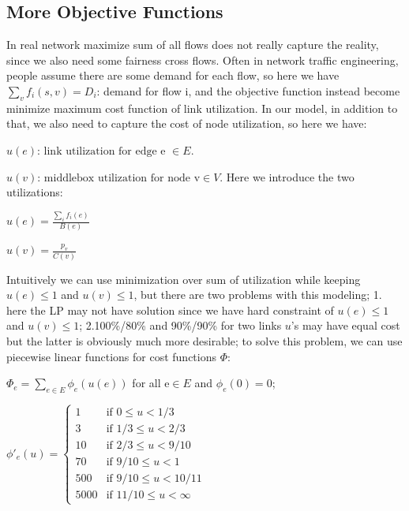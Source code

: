 \documentclass[twoside,leqno, 11pt]{article}
\begin{document}
\subsection {More Objective Functions} In real network maximize sum of all flows does not really capture the reality, since we also need some fairness cross flows. Often in network traffic engineering, people assume there are some demand for each flow, so here we have $\sum\limits_v f_i (s, v) =D_i$: demand for flow i, and the objective function instead become minimize maximum cost function of link utilization. In our model, in addition to that, we also need to capture the cost of node utilization, so here we have:

$u(e) $: $ \text{link utilization for edge e }\in E $.

$u(v)$: $ \text{middlebox utilization for node v} \in V$.
\newline\newline
Here we introduce the two utilizations: 
\newline

$u(e) = \frac{\sum\limits_{i} f_{i}(e) } {B(e)}$ \newline

$u(v) = \frac{ p_v } {C(v)} $ \newline 

Intuitively we can use minimization over sum of utilization while keeping $u(e)\leq 1$ and $u(v)\leq 1$, but there are two problems with this modeling; 1. here the LP may not have solution since we have hard constraint of   $u(e)\leq 1$ and $u(v)\leq 1$; 2.100\%/80\% and 90\%/90\% for two links $u$'s may have equal cost but the latter is obviously much more desirable; to solve this problem, we can use piecewise linear functions for cost functions $\Phi$: %
 
 $\Phi_e = \sum\limits_{e\in E} \phi_e(u (e) )$ for all e$\in E$ and $ \phi_e(0)=0$; 
 
$
\phi'_e(u )=
\left\{
	\begin{array}{ll}
		1  & \mbox{if } 0\leq u <1/3 \\
		3 & \mbox{if } 1/3\leq u < 2/3 \\
		10 & \mbox{if } 2/3\leq u < 9/10 \\
		70 & \mbox{if } 9/10\leq u < 1\\
		500 & \mbox{if } 9/10\leq u < 10/11\\
		5000 & \mbox{if } 11/10\leq u < \infty
	\end{array}
\right.
$
\end{document}
